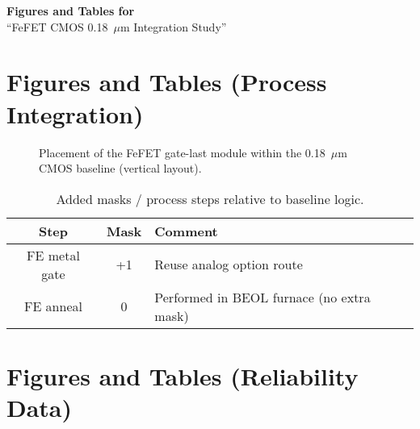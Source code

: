 \documentclass[conference]{IEEEtran}
\begin{document}
\begingroup
\centering
{\LARGE \textbf{Figures and Tables for}}\\[0.25em]
{\Large ``FeFET CMOS 0.18~$\mu$m Integration Study''}\par
\endgroup
\vspace{1.0em}

\section*{Figures and Tables (Process Integration)}

\begin{figure}[!t]
\centering
\caption{Placement of the FeFET gate-last module within the 0.18~$\mu$m CMOS baseline (vertical layout).}
\end{figure}

\vspace{1.2em}

\begin{table}[!t]
\centering
\caption{Added masks / process steps relative to baseline logic.}
\begin{tabular}{|c|c|l|}\hline
Step & Mask & Comment\\ \hline
FE metal gate & +1 & Reuse analog option route\\
FE anneal     & 0  & Performed in BEOL furnace (no extra mask)\\ \hline
\end{tabular}
\end{table}

\clearpage %

\section*{Figures and Tables (Reliability Data)}
\end{document}
